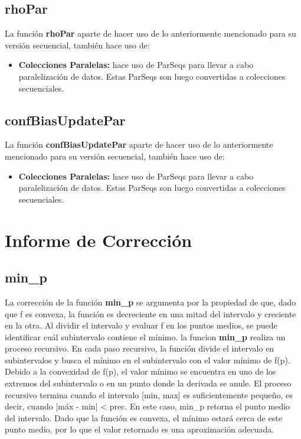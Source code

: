 \documentclass{article}
\begin{document}
    \subsection{rhoPar}
    La función \textbf{rhoPar} aparte de hacer uso de lo anteriormente mencionado para su versión secuencial, también hace uso de:

    \begin{itemize}
      \item \textbf{Colecciones Paralelas:} hace uso de ParSeqs para llevar a cabo paralelización de datos. Estas ParSeqs son luego convertidas a colecciones secuenciales.
    \end{itemize}

    \subsection{confBiasUpdatePar}
    La función \textbf{confBiasUpdatePar} aparte de hacer uso de lo anteriormente mencionado para su versión secuencial, también hace uso de:

    \begin{itemize}
      \item \textbf{Colecciones Paralelas:} hace uso de ParSeqs para llevar a cabo paralelización de datos. Estas ParSeqs son luego convertidas a colecciones secuenciales.
    \end{itemize}

  \section{Informe de Corrección}

    \subsection{min\_p}
    La corrección de la función \textbf{min\_p} se argumenta por la propiedad de que, dado que f es convexa, la función es decreciente en una mitad del intervalo y creciente en la otra. Al dividir el intervalo y evaluar f en los puntos medios, se puede identificar cuál subintervalo contiene el mínimo.
    la funcion \textbf{min\_p} realiza un proceso recursivo. En cada paso recursivo, la función divide el intervalo en subintervalos y busca el mínimo en el subintervalo con el valor mínimo de f(p). Debido a la convexidad de f(p), el valor mínimo se encuentra en uno de los extremos del subintervalo o en un punto donde la derivada se anule.
    El proceso recursivo termina cuando el intervalo [min, max] es suficientemente pequeño, es decir, cuando |máx - min| < prec. En este caso, min_p retorna el punto medio del intervalo. Dado que la función es convexa, el mínimo estará cerca de este punto medio, por lo que el valor retornado es una aproximación adecuada.
\end{document}
